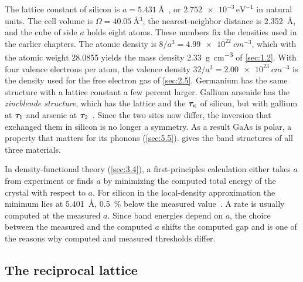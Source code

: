 The lattice constant of silicon is $a = \SI{5.431}{\angstrom}$~\cite[lattice parameter of silicon]{mohr2025codata}, or $\num{2.752e-3}\,\mathrm{eV}^{-1}$ in natural units. The cell volume is $\Omega = \SI{40.05}{\angstrom^3}$, the nearest-neighbor distance is \SI{2.352}{\angstrom}, and the cube of side $a$ holds eight atoms. These numbers fix the densities used in the earlier chapters. The atomic density is $8/a^3 = \SI{4.99e22}{cm^{-3}}$, which with the atomic weight 28.0855 yields the mass density \SI{2.33}{g.cm^{-3}} of \cref{sec:1.2}. With four valence electrons per atom, the valence density $32/a^3 = \SI{2.00e23}{cm^{-3}}$ is the density used for the free electron gas of \cref{sec:2.5}. Germanium has the same structure with a lattice constant a few percent larger. Gallium arsenide has the \emph{zincblende structure}, which has the lattice and the $\bm{\tau}_\kappa$ of silicon, but with gallium at $\bm{\tau}_1$ and arsenic at $\bm{\tau}_2$~\cite[Chap.~4]{ashcroft1976solid}. Since the two sites now differ, the inversion that exchanged them in silicon is no longer a symmetry. As a result GaAs is polar, a property that matters for its phonons (\cref{sec:5.5}).  gives the band structures of all three materials.

In density-functional theory (\cref{sec:3.4}), a first-principles calculation either takes $a$ from experiment or finds $a$ by minimizing the computed total energy of the crystal with respect to $a$. For silicon in the local-density approximation the minimum lies at \SI{5.401}{\angstrom}, \SI{0.5}{\percent} below the measured value~\cite[Sect.~10.2]{ponce2016epw}. A rate is usually computed at the measured $a$. Since band energies depend on $a$, the choice between the measured and the computed $a$ shifts the computed gap and is one of the reasons why computed and measured thresholds differ.

\subsection{The reciprocal lattice}

